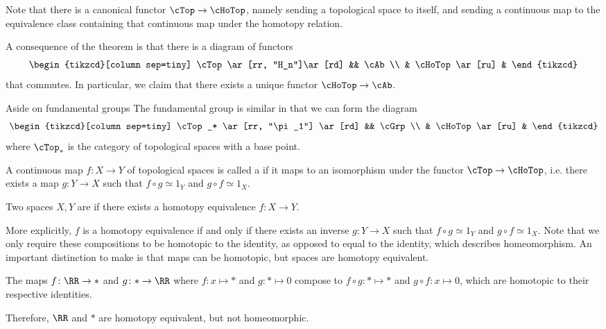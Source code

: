 \documentclass{standalone}
\begin{document}
Note that there is a canonical functor \(\cTop \to \cHoTop\), namely
sending a topological space to itself, and
sending a continuous map to the equivalence class containing that continuous
map under the homotopy relation.

A consequence of the theorem is that there is a diagram of functors
\[
  \begin{tikzcd}[column sep=tiny]
    \cTop \ar[rr, "H_n"]\ar[rd] && \cAb \\
    & \cHoTop \ar[ru] &
  \end{tikzcd}
\]
that commutes. In particular, we claim that there exists a unique functor
\(\cHoTop \to \cAb\).

\begin{adhoctheorem*}{Aside on fundamental groups}
  The fundamental group is similar in that we can form the diagram
  \[
    \begin{tikzcd}[column sep=tiny]
      \cTop_* \ar[rr, "\pi_1"] \ar[rd] && \cGrp \\
      & \cHoTop \ar[ru] &
    \end{tikzcd}
  \]
  where \(\cTop_*\) is the category of topological spaces with a base point.
\end{adhoctheorem*}

\begin{definition}
  A continuous map \(f \colon X \to Y\) of topological spaces is called a
   if it maps to an isomorphism under the functor
  \(\cTop \to \cHoTop\), i.e. there exists a map \(g \colon Y \to X\) such that
  \(f \circ g \simeq 1_Y\) and \(g \circ f \simeq 1_X\).

  Two spaces \(X, Y\) are  if there exists
  a homotopy equivalence \(f \colon X \to Y\).
\end{definition}

More explicitly, \(f\) is a homotopy equivalence if and only if there exists
an inverse \(g \colon Y \to X\) such that \(f \circ g \simeq 1_Y\) and
\(g \circ f \simeq 1_X\). Note that we only require these compositions to
be homotopic to the identity, as opposed to equal to the identity, which
describes homeomorphism. An important distinction to make is that maps
can be homotopic, but spaces are homotopy equivalent.

\begin{example}
  The maps \(f \colon \RR \to *\) and \(g \colon * \to \RR\) where
  \(f \colon x \mapsto *\) and \(g \colon * \mapsto 0\) compose to
  \(f \circ g \colon * \mapsto *\) and \(g \circ f \colon x \mapsto 0\),
  which are homotopic to their respective identities.

  Therefore, \(\RR\) and \(*\) are homotopy equivalent, but not homeomorphic.
\end{example}
\end{document}
